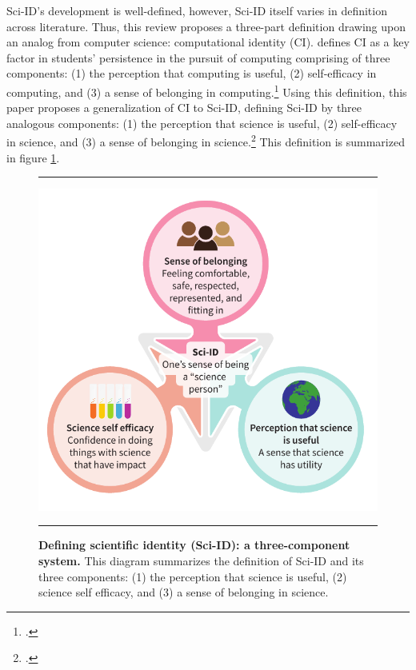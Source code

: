 \documentclass[10pt, twocolumn]{article}
\begin{document}
        Sci-ID's development is well-defined, however, Sci-ID itself varies in definition across literature. Thus, this review proposes a three-part definition drawing upon an analog from computer science: computational identity (CI). \cite{brousseau_position_2019} defines CI as a key factor in students' persistence in the pursuit of computing comprising of three components: (1) the perception that computing is useful, (2) self-efficacy in computing, and (3) a sense of belonging in computing.\footcite{brousseau_position_2019} Using this definition, this paper proposes a generalization of CI to Sci-ID, defining Sci-ID by three analogous components: (1) the perception that science is useful, (2) self-efficacy in science, and (3) a sense of belonging in science.\footcite{brousseau_position_2019} This definition is summarized in figure \ref{fig:sci_id}.

        \begin{figure}[h]
            \rule{\columnwidth}{1pt}
            \begin{center}
            \includegraphics[width = \columnwidth]{figures/sci-id.pdf}
            \end{center}
            \caption{\textbf{Defining scientific identity (Sci-ID): a three-component system.} This diagram summarizes the definition of Sci-ID and its three components: (1) the perception that science is useful, (2) science self efficacy, and (3) a sense of belonging in science.}
            \label{fig:sci_id}
            \rule{\columnwidth}{1pt}
        \end{figure}
\end{document}
